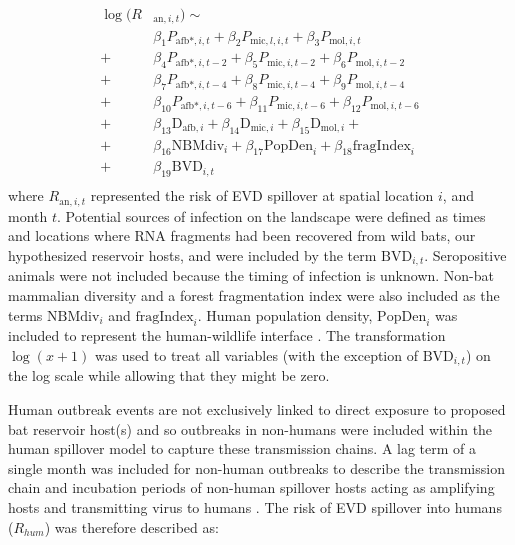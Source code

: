 \documentclass[a4paper,twoside, onecolumn]{article}
\newcommand{\afb}{\mathrm{afb}}
\newcommand{\mic}{\mathrm{mic}}
\newcommand{\mol}{\mathrm{mol}}
\newcommand{\Div}{\mathrm{D}}
\begin{document}
	\[
	\begin{split}
	\log(R&_{\mathrm{an}, i, t}) \sim \\
	&\beta_1 P_{\afb*, i, t} + \beta_2 P_{\mic, l, i, t} + \beta_3 P_{\mol, i, t} \\
	+ &\beta_4 P_{\afb*, i, t-2} + \beta_5 P_{\mic, i, t-2} + \beta_6 P_{\mol, i, t-2} \\
	+ &\beta_7 P_{\afb*, i, t-4} + \beta_8 P_{\mic, i, t-4} + \beta_9 P_{\mol, i, t-4} \\
	+ &\beta_{10} P_{\afb*, i, t-6} + \beta_{11} P_{\mic, i, t-6} + \beta_{12} P_{\mol, i, t-6} \\
	+ &\beta_{13}\Div_{\afb, i} + \beta_{14}\Div_{\mic, i} + \beta_{15}\Div_{\mol, i} + \\
	+ &\beta_{16} \mathrm{NBM div}_{i} + \beta_{17}\mathrm{PopDen}_{i} + \beta_{18} \mathrm{fragIndex}_{i}\\
	+ &\beta_{19}\mathrm{BVD}_{i,t}  \\
	\end{split}
	\]
	where $R_{\mathrm{an}, i, t}$ represented the risk of EVD spillover at spatial location $i$, and month $t$. Potential sources of infection on the landscape were defined as times and locations where RNA fragments had been recovered from wild bats, our hypothesized reservoir hosts, and were included by the term $\mathrm{BVD}_{i,t}$. Seropositive animals were not included because the timing of infection is unknown. Non-bat mammalian diversity and a forest fragmentation index \cite{Wilkinson2018} were also included as the terms $\mathrm{NBM div}_{i}$ and $\mathrm{fragIndex}_{i}$. Human population density, $\mathrm{PopDen}_{i}$ was included to represent the human-wildlife interface \cite{Plowright2015}. The transformation $\log(x + 1)$ was used to treat all variables (with the exception of $\mathrm{BVD}_{i,t}$) on the log scale while allowing that they might be zero. \par
	Human outbreak events are not exclusively linked to direct exposure to proposed bat reservoir host(s) \cite{Pourrut2005} and so outbreaks in non-humans were included within the human spillover model to capture these transmission chains. A lag term of a single month was included for non-human outbreaks to describe the transmission chain and incubation periods of non-human spillover hosts acting as amplifying hosts and transmitting virus to humans \cite{Swanepoel1996}. The risk of EVD spillover into humans ($R_{hum}$) was therefore described as:
\end{document}

